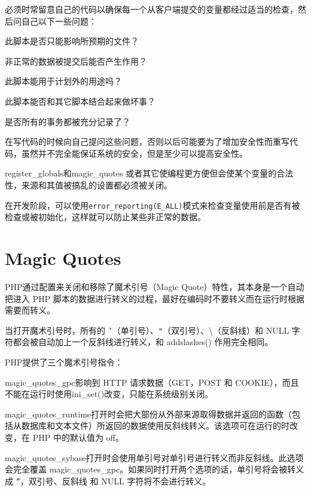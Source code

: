 必须时常留意自己的代码以确保每一个从客户端提交的变量都经过适当的检查，然后问自己以下一些问题：


\begin{compactitem}
\item 此脚本是否只能影响所预期的文件？
\item 非正常的数据被提交后能否产生作用？
\item 此脚本能用于计划外的用途吗？
\item 此脚本能否和其它脚本结合起来做坏事？
\item 是否所有的事务都被充分记录了？
\end{compactitem}

在写代码的时候向自己提问这些问题，否则以后可能要为了增加安全性而重写代码，虽然并不完全能保证系统的安全，但是至少可以提高安全性。

register\_globals和magic\_quotes 或者其它使编程更方便但会使某个变量的合法性，来源和其值被搞乱的设置都必须被关闭。

在开发阶段，可以使用\texttt{error\_reporting(E\_ALL)}模式来检查变量使用前是否有被检查或被初始化，这样就可以防止某些非正常的数据。

\section{Magic Quotes}

PHP通过配置来关闭和移除了魔术引号（Magic Quote）特性，其本身是一个自动把进入 PHP 脚本的数据进行转义的过程，最好在编码时不要转义而在运行时根据需要而转义。

当打开魔术引号时，所有的 \texttt{'}（单引号）、\texttt{"}（双引号）、\textbackslash （反斜线）和 NULL 字符都会被自动加上一个反斜线进行转义，和 addslashes() 作用完全相同。

PHP提供了三个魔术引号指令：

\begin{compactitem}
\item magic\_quotes\_gpc影响到 HTTP 请求数据（GET，POST 和 COOKIE），而且不能在运行时使用ini\_set()改变，只能在系统级别关闭。
\item magic\_quotes\_runtime打开时会把大部份从外部来源取得数据并返回的函数（包括从数据库和文本文件）所返回的数据使用反斜线转义。该选项可在运行的时改变，在 PHP 中的默认值为 off。 
\item magic\_quotes\_sybase打开时会使用单引号对单引号进行转义而非反斜线。此选项会完全覆盖 magic\_quotes\_gpc。如果同时打开两个选项的话，单引号将会被转义成 \texttt{''}，双引号、反斜线 和 NULL 字符将不会进行转义。
\end{compactitem}


